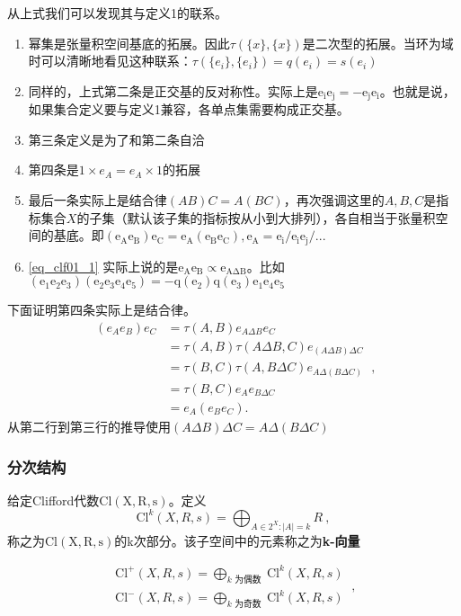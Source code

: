 从上式我们可以发现其与定义1的联系。
\begin{enumerate}
\item 幂集是张量积空间基底的拓展。因此$\tau(\{x\},\{x\})$是二次型的拓展。当环为域时可以清晰地看见这种联系：$\tau(\{e_i\},\{e_i\})=q(e_i)=s(e_i)$
\item 同样的，上式第二条是正交基的反对称性。实际上是$\mathrm {e_ie_j=-e_je_i}$。也就是说，如果集合定义要与定义1兼容，各单点集需要构成正交基。
\item 第三条定义是为了和第二条自洽
\item 第四条是$1\times e_A=e_A\times 1$的拓展
\item 最后一条实际上是结合律$(AB)C=A(BC)$，再次强调这里的$A,B,C$是指标集合$X$的子集（默认该子集的指标按从小到大排列），各自相当于张量积空间的基底。即$\mathrm {(e_Ae_B)e_C=e_A(e_Be_C),e_A=e_i/e_ie_j/...}$
\item \autoref{eq_clf01_1} 实际上说的是$\mathrm {e_A e_B\propto e_{A\Delta B}}$。比如$\mathrm {(e_{1}e_{2}e_{3})(e_{2}e_{3}e_{4}e_{5})=-q(e_2)q(e_3)e_1 e_4 e_5}$
\end{enumerate}

下面证明第四条实际上是结合律。
\begin{equation}
\begin{aligned}
\left(e_A e_B\right) e_C & =\tau(A, B) e_{A \Delta B} e_C \\
& =\tau(A, B) \tau(A \Delta B, C) e_{(A \Delta B) \Delta C} \\
& =\tau(B, C) \tau(A, B \Delta C) e_{A \Delta(B \Delta C)} \\
& =\tau(B, C) e_A e_{B \Delta C} \\
& =e_A\left(e_B e_C\right) .
\end{aligned}~,
\end{equation}
从第二行到第三行的推导使用$(A \Delta B) \Delta C=A \Delta(B \Delta C)$
\subsubsection{分次结构}
\begin{definition}{}
给定Clifford代数$\mathrm {Cl(X,R,s)}$。定义
\begin{equation}
\mathrm{Cl}^k(X,R,s)=\bigoplus_{A \in 2^X:|A|=k}R~,
\end{equation}
称之为$\mathrm {Cl(X,R,s)}$的k次部分。该子空间中的元素称之为\textbf{k-向量}
\end{definition}
\begin{definition}{}
\begin{equation}
\begin{array}{l}
\mathrm{Cl}^{+}(X, R, s)=\bigoplus_{k \text { 为偶数 }} \mathrm{Cl}^k(X, R, s) \\
\mathrm{Cl}^{-}(X, R, s)=\bigoplus_{k \text { 为奇数 }} \mathrm{Cl}^k(X, R, s)
\end{array}~,
\end{equation}
\end{definition}






